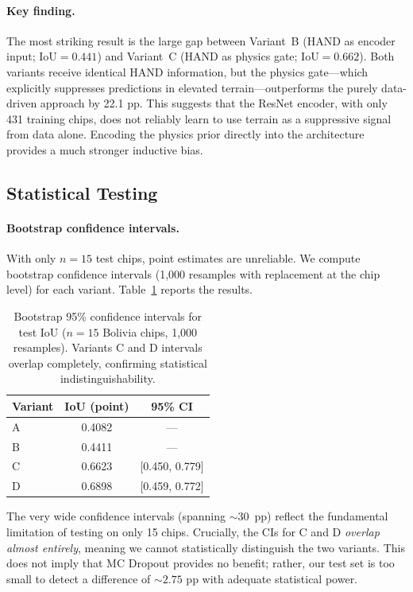 \documentclass[12pt]{article}
\newcommand{\IoU}{\mathrm{IoU}}
\begin{document}
\paragraph{Key finding.}
The most striking result is the large gap between Variant~B (HAND as encoder
input; $\IoU=0.441$) and Variant~C (HAND as physics gate; $\IoU=0.662$).  Both
variants receive identical HAND information, but the physics gate—which
explicitly suppresses predictions in elevated terrain—outperforms the purely
data-driven approach by 22.1 pp.  This suggests that the ResNet encoder, with
only 431 training chips, does not reliably learn to use terrain as a suppressive
signal from data alone.  Encoding the physics prior directly into the architecture
provides a much stronger inductive bias.

\subsection{Statistical Testing}
\label{sec:stats}

\paragraph{Bootstrap confidence intervals.}
With only $n=15$ test chips, point estimates are unreliable.  We compute
bootstrap confidence intervals (1{,}000 resamples with replacement at the chip
level) for each variant.  Table~\ref{tab:bootstrap} reports the results.

\begin{table}[h]
\centering
\caption{Bootstrap 95\% confidence intervals for test IoU ($n=15$ Bolivia chips,
1{,}000 resamples).  Variants C and D intervals overlap completely, confirming
statistical indistinguishability.}
\label{tab:bootstrap}
\begin{tabular}{lcc}
\toprule
\textbf{Variant} & \textbf{IoU (point)} & \textbf{95\% CI} \\
\midrule
A       & 0.4082 & — \\
B       & 0.4411 & — \\
C       & 0.6623 & [0.450, 0.779] \\
D       & 0.6898 & [0.459, 0.772] \\
\bottomrule
\end{tabular}
\end{table}

The very wide confidence intervals (spanning $\sim 30$~pp) reflect the
fundamental limitation of testing on only 15 chips.  Crucially, the CIs for
C and D \emph{overlap almost entirely}, meaning we cannot statistically
distinguish the two variants.  This does not imply that MC Dropout provides
no benefit; rather, our test set is too small to detect a difference of
$\sim 2.75$ pp with adequate statistical power.
\end{document}
